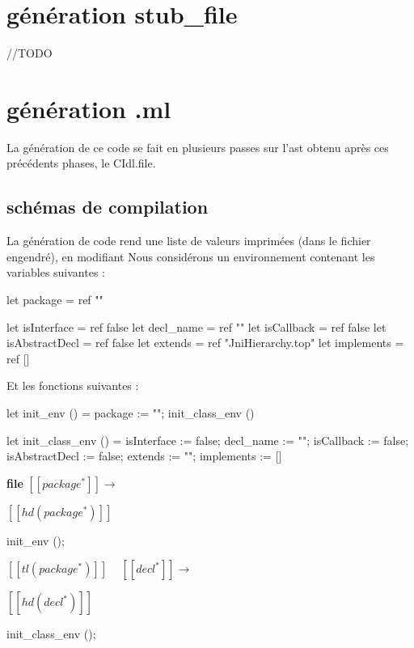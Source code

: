\documentclass[a4paper, 11pt]{report}
\begin{document}
\section{génération stub\_file}
//TODO











\section{génération .ml}

La génération de ce code se fait en plusieurs passes sur l'ast obtenu
après ces précédents phases, le CIdl.file.

\subsection{schémas de compilation}
La génération de code rend une liste de valeurs imprimées (dans le
fichier engendré), en modifiant
Nous considérons un environnement contenant les  variables suivantes : 
\begin{OCaml}
let package = ref ""

let isInterface = ref false
let decl_name = ref ""
let isCallback = ref false
let isAbstractDecl = ref false
let extends = ref "JniHierarchy.top"
let implements = ref []
\end{OCaml}
Et les fonctions suivantes :
\begin{OCaml}
let init_env () =
  package := "";
  init_class_env ()

let init_class_env () =
  isInterface := false;
  decl_name := "";
  isCallback := false;
  isAbstractDecl := false;
  extends := "";
  implements := []
\end{OCaml}
\textbf{file}
\newline
\noindent
$[\![ package^* ]\!]$$\longrightarrow$

$[\![ hd(package^*) ]\!]$
\begin{OCaml}
   init_env ();
\end{OCaml} 

$[\![ tl(package^*) ]\!]$ 
\newline
\ 
\newline
\noindent
$[\![ decl^* ]\!]$$\longrightarrow$

$[\![ hd(decl^*) ]\!]$
\begin{OCaml}
   init_class_env ();
\end{OCaml} 
\end{document}
